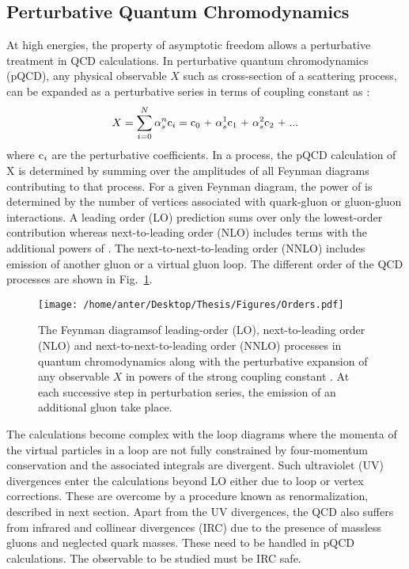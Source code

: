 \subsection{Perturbative Quantum Chromodynamics}
At high energies, the property of asymptotic freedom allows a perturbative treatment in QCD calculations. In perturbative quantum chromodynamics (pQCD), any physical observable $X$ such as cross-section of a scattering process, can be expanded as a perturbative series in terms of coupling constant \alps as : 
\begin{equation}
X = \sum\limits_{i=0}^{N} \alpha^n_s {\rm c}_i = {\rm c}_0~\plus \alpha^1_s {\rm c}_1~\plus \alpha^2_s {\rm c}_2~\plus ...
\end{equation} 
where ${\rm c}_i$ are the perturbative coefficients. In a process, the pQCD calculation of X is determined by summing over the amplitudes of all Feynman diagrams contributing to that process. For a given Feynman diagram, the power of \alps is determined by the number of vertices associated with quark-gluon or gluon-gluon interactions. A leading order (LO) prediction sums over only the lowest-order contribution whereas next-to-leading order (NLO) includes terms with the additional powers of \alps. The next-to-next-to-leading order (NNLO) includes emission of another gluon or a virtual gluon loop. The different order of the QCD processes are shown in Fig.~\ref{fig:orders}.
\begin{figure}[!h]
\begin{center}
\hspace*{-1mm}
\texttt{[image: /home/anter/Desktop/Thesis/Figures/Orders.pdf]}\\
\vspace*{4mm}
\caption[The Feynman diagrams of leading-order (LO), next-to-leading order (NLO) and next-to-next-to-leading order (NNLO) processes in quantum chromodynamics.]{The Feynman diagrams\footnotemark of leading-order (LO), next-to-leading order (NLO) and next-to-next-to-leading order (NNLO) processes in quantum chromodynamics along with the perturbative expansion of any observable $X$ in powers of the strong coupling constant \alps. At each successive step in perturbation series, the emission of an additional gluon take place.}
\label{fig:orders}
\end{center}
\end{figure}
The calculations become complex with the loop diagrams where the momenta of the virtual particles in a loop are not fully constrained by four-momentum conservation and the associated integrals are divergent. Such ultraviolet (UV) divergences enter the calculations beyond LO either due to loop or vertex corrections. These are overcome by a procedure known as renormalization, described in next section. Apart from the UV divergences, the QCD also suffers from infrared and collinear divergences (IRC) due to the presence of massless gluons and neglected quark masses. These need to be handled in pQCD calculations. The observable to be studied must be IRC safe. 
